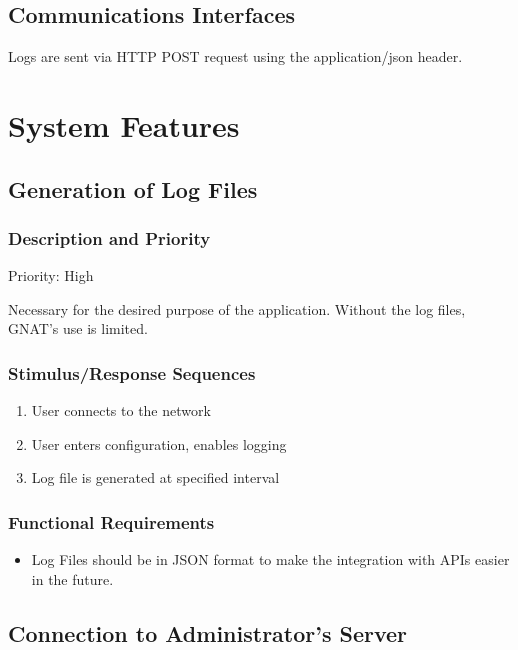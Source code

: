 \documentclass{scrreprt}
\begin{document}
\section{Communications Interfaces}

Logs are sent via HTTP POST request using the application/json header.

\chapter{System Features}

\section{Generation of Log Files}

\subsection{Description and Priority}

Priority: High

Necessary for the desired purpose of the application.  Without the log files, GNAT's use is limited.

\subsection{Stimulus/Response Sequences}
\begin{enumerate}
\item User connects to the network
\item User enters configuration, enables logging
\item Log file is generated at specified interval
\end{enumerate}

\subsection{Functional Requirements}

\begin{itemize}
\item Log Files should be in JSON format to make the integration with APIs easier in the future.
\end{itemize}

\section{Connection to Administrator's Server}
\end{document}
